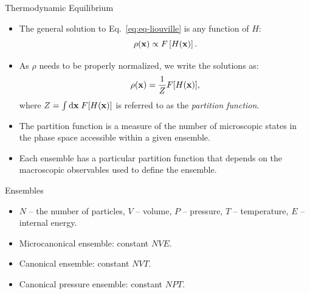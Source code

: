 \documentclass[10pt]{beamer}
\begin{document}
\begin{frame}{Thermodynamic Equilibrium}
\begin{itemize}
\setlength\itemsep{1em}
  \item The general solution to Eq.~\ref{eq:eq-liouville} is any function of $H$:
  \begin{equation}
    \label{eq:gen_sol}
    \rho({\bf x}) \propto F\left[H({\bf x})\right].
  \end{equation}

  \item As $\rho$ needs to be properly normalized, we write the solutions as:
  \begin{equation}
    \rho({\bf x}) = \frac{1}{Z} F[H({\bf x})],
  \end{equation}
  where $Z = \int\mathrm{d}{\bf x}\; F[H({\bf x})]$ is referred to as the \textit{partition function}.

  \item The partition function is a measure of the number of microscopic states in the phase space accessible within a given ensemble.

  \item Each ensemble has a particular partition function that depends on the macroscopic observables used to define the ensemble.
\end{itemize}
\end{frame}

\begin{frame}{Ensembles}
\begin{itemize}
\setlength\itemsep{1em}
  \item $N$ -- the number of particles, $V$ -- volume, $P$ -- pressure, $T$ -- temperature, $E$ -- internal energy.

  \item Microcanonical ensemble: constant $NVE$.

  \item Canonical ensemble: constant $NVT$.

  \item Canonical pressure ensemble: constant $NPT$.
\end{itemize}
\end{frame}
\end{document}
